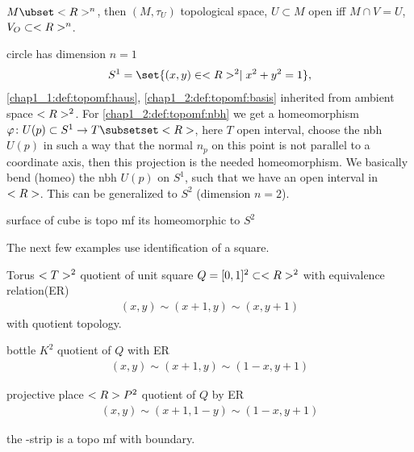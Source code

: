 \begin{example}
	\begin{expenum}
	\item $M \ubset \R^n$, then $(M,\tau_U)$ topological space, $U \subset M$ open iff $M\cap V = U$, $V_O \subset <R>^n$.
	\item circle has dimension $n=1$
	\begin{align*}
		S^1 = \set{(x,y) \in \R^2 \mid x^2 + y^2 = 1},
	\end{align*}
	\cref{chap1_1:def:topomf:haus}, \cref{chap1_2:def:topomf:basis} inherited from ambient space $<R>^2$. For \cref{chap1_2:def:topomf:nbh} we get a homeomorphism $\phi \colon U(p) \subset S^1 \to T \subsetset \R$, here $T$ open interval, choose the nbh $U(p)$ in such a way that the normal $n_p$ on this point is not parallel to a coordinate axis, then this projection is the needed homeomorphism. We basically bend (homeo) the nbh $U(p)$ on $S^1$, such that we have an open interval in $<R>$. 
	This can be generalized to $S^2$ (dimension $n=2$).
	\item surface of cube is topo mf its homeomorphic to $S^2$
	\end{expenum}
\end{example}
The next few examples use identification of a square.
\begin{example}
	\begin{expenum}
		\item Torus $<T>^2$ quotient of unit square $Q=[0,1]^2 \subset <R>^2$ with equivalence relation(ER)
		\begin{align*}
			(x,y) \sim (x+1,y) \sim (x,y+1)
		\end{align*}
		with quotient topology.
		\item{} bottle $K^2$ quotient of $Q$ with ER
		\begin{align*}
			(x,y) \sim (x+1,y) \sim (1-x,y+1)
		\end{align*}
		\item projective place $<R> P^2$ quotient of $Q$ by ER
		\begin{align*}
			(x,y)\sim (x+1,1-y) \sim (1-x,y+1)
		\end{align*}
	\end{expenum}
\end{example}
\begin{*example}
	the -strip is a topo mf with boundary.
\end{*example}
\begin{definition}
\end{definition}
